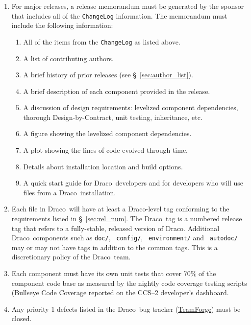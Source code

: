 \documentclass[note]{ResearchNote_pdf}
\newcommand{\draco}{{\normalfont\small\sffamily Draco}}
\begin{document}
\begin{enumerate}
\item For major releases, a release memorandum must be generated by the
  sponsor that includes all of the \texttt{ChangeLog} information.
  The memorandum must include the following information:
  \begin{enumerate}
    \item All of the items from the \texttt{ChangeLog} as listed above.
    \item A list of contributing authors.
    \item A brief history of prior releases (see
      \S~\ref{sec:author_list}).
    \item A brief description of each component provided in the
      release. 
    \item A discussion of design requirements: levelized component
      dependencies, thorough Design-by-Contract, unit testing,
      inheritance, etc.
    \item A figure showing the levelized component dependencies.
    \item A plot showing the lines-of-code evolved through time.
    \item Details about installation location and build options.
    \item A quick start guide for \draco\ developers and for
      developers who will use files from a \draco\ installation.
  \end{enumerate}
\item Each file in \draco\ will have at least a \draco-level tag
  conforming to the requirements listed in \S~\ref{sec:rel_num}.  The
  \draco\ tag is a numbered release tag that refers to a fully-stable,
  released version of \draco. Additional \draco\ components such as
  \texttt{doc/}, ~\texttt{config/}, ~\texttt{environment/} and
  ~\texttt{autodoc/} may or may not have tags in addition to the
  common tags.  This is a discretionary policy of the \draco\ team.

\item Each component must have its own unit tests that cover 70\% of
  the component code base as measured by the nightly code coverage
  testing scripts (Bullseye Code Coverage\cite{bullseyeweb} reported
  on the CCS--2 developer's dashboard\cite{codercdash,cmake}.

\item Any priority 1 defects listed in the \draco\ bug tracker
  (\href{https://tf.lanl.gov/sf/tracker/do/listTrackers/projects.draco/tracker}{TeamForge})
  must be closed. 


\end{enumerate}
\end{document}

